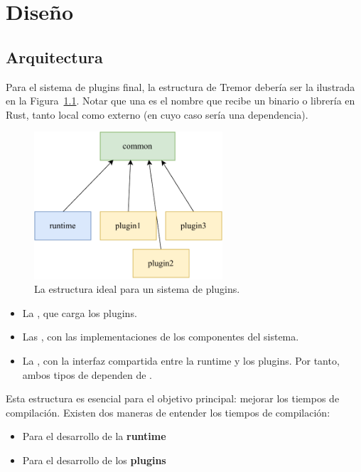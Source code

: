 
\chapter{Diseño}\label{sec:design}

\section{Arquitectura}

Para el sistema de plugins final, la estructura de Tremor debería ser la
ilustrada en la Figura~\ref{fig:separation}. Notar que una \crate es el nombre
que recibe un binario o librería en Rust, tanto local como externo (en cuyo caso
sería una dependencia).

\begin{figure}
    \centering
    \includegraphics[width=7cm]{./Imagenes/separation.pdf}
    \caption{La estructura ideal para un sistema de plugins.}%
    \label{fig:separation}
\end{figure}

\begin{itemize}
    \item La \crate {}, que carga los plugins.

    \item Las \crates {}, con las implementaciones de los componentes
        del sistema.

    \item La \crate {}, con la interfaz compartida entre la runtime y
        los plugins. Por tanto, ambos tipos de \crate dependen de .

\end{itemize}

Esta estructura es esencial para el objetivo principal: mejorar los tiempos de
compilación. Existen dos maneras de entender los tiempos de compilación:

\begin{itemize}
    \item Para el desarrollo de la \textbf{runtime}

    \item Para el desarrollo de los \textbf{plugins}

\end{itemize}

